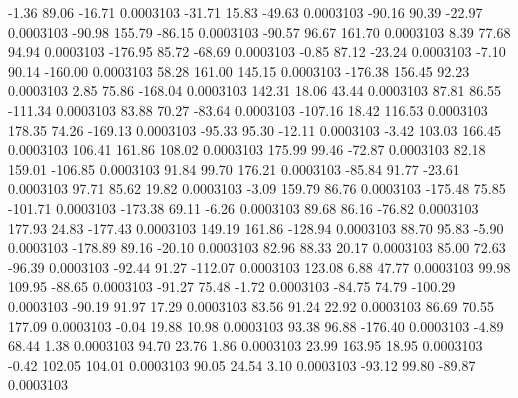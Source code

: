        -1.36       89.06      -16.71     0.0003103
      -31.71       15.83      -49.63     0.0003103
      -90.16       90.39      -22.97     0.0003103
      -90.98      155.79      -86.15     0.0003103
      -90.57       96.67      161.70     0.0003103
        8.39       77.68       94.94     0.0003103
     -176.95       85.72      -68.69     0.0003103
       -0.85       87.12      -23.24     0.0003103
       -7.10       90.14     -160.00     0.0003103
       58.28      161.00      145.15     0.0003103
     -176.38      156.45       92.23     0.0003103
        2.85       75.86     -168.04     0.0003103
      142.31       18.06       43.44     0.0003103
       87.81       86.55     -111.34     0.0003103
       83.88       70.27      -83.64     0.0003103
     -107.16       18.42      116.53     0.0003103
      178.35       74.26     -169.13     0.0003103
      -95.33       95.30      -12.11     0.0003103
       -3.42      103.03      166.45     0.0003103
      106.41      161.86      108.02     0.0003103
      175.99       99.46      -72.87     0.0003103
       82.18      159.01     -106.85     0.0003103
       91.84       99.70      176.21     0.0003103
      -85.84       91.77      -23.61     0.0003103
       97.71       85.62       19.82     0.0003103
       -3.09      159.79       86.76     0.0003103
     -175.48       75.85     -101.71     0.0003103
     -173.38       69.11       -6.26     0.0003103
       89.68       86.16      -76.82     0.0003103
      177.93       24.83     -177.43     0.0003103
      149.19      161.86     -128.94     0.0003103
       88.70       95.83       -5.90     0.0003103
     -178.89       89.16      -20.10     0.0003103
       82.96       88.33       20.17     0.0003103
       85.00       72.63      -96.39     0.0003103
      -92.44       91.27     -112.07     0.0003103
      123.08        6.88       47.77     0.0003103
       99.98      109.95      -88.65     0.0003103
      -91.27       75.48       -1.72     0.0003103
      -84.75       74.79     -100.29     0.0003103
      -90.19       91.97       17.29     0.0003103
       83.56       91.24       22.92     0.0003103
       86.69       70.55      177.09     0.0003103
       -0.04       19.88       10.98     0.0003103
       93.38       96.88     -176.40     0.0003103
       -4.89       68.44        1.38     0.0003103
       94.70       23.76        1.86     0.0003103
       23.99      163.95       18.95     0.0003103
       -0.42      102.05      104.01     0.0003103
       90.05       24.54        3.10     0.0003103
      -93.12       99.80      -89.87     0.0003103
